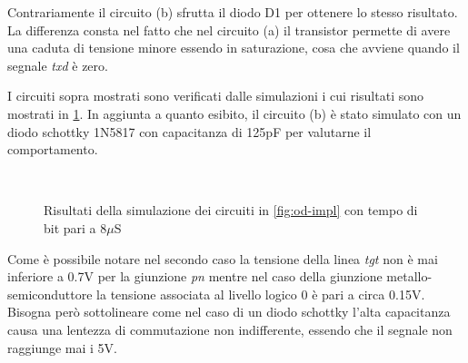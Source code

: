 Contrariamente il circuito (b) sfrutta il diodo D1 per ottenere lo stesso risultato. La differenza consta nel fatto che nel circuito (a) il transistor permette di avere una caduta di tensione minore essendo in saturazione, cosa che avviene quando il segnale \textit{txd} è zero.

I circuiti sopra mostrati sono verificati dalle simulazioni i cui risultati sono mostrati in \cref{graph:sim}. In aggiunta a quanto esibito, il circuito (b) è stato simulato con un diodo schottky 1N5817 con capacitanza di 125pF per valutarne il comportamento.

\begin{figure}
    \centering
        \\
        \vfill
    \caption[]{Risultati della simulazione dei circuiti in \cref{fig:od-impl} con tempo di bit pari a 8\(\mu\)S}\label{graph:sim}
\end{figure}

Come è possibile notare nel secondo caso la tensione della linea \textit{tgt} non è mai inferiore a 0.7V per la giunzione \textit{pn} mentre nel caso della giunzione metallo-semiconduttore la tensione associata al livello logico 0 è pari a circa 0.15V. Bisogna però sottolineare come nel caso di un diodo schottky l'alta capacitanza causa una lentezza di commutazione non indifferente, essendo che il segnale non raggiunge mai i 5V. 


